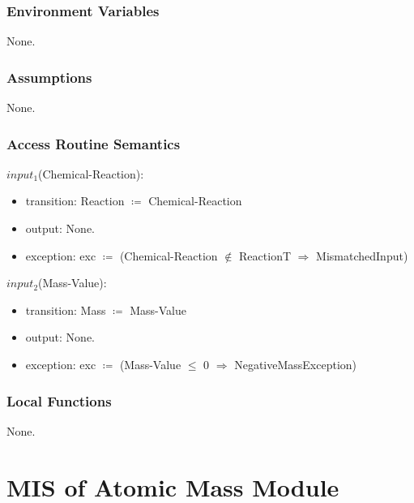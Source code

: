 \documentclass[12pt, titlepage]{article}
\begin{document}
\subsubsection{Environment Variables}

None. 

\subsubsection{Assumptions}

None.

\subsubsection{Access Routine Semantics}

\noindent $input_1$(Chemical-Reaction):
\begin{itemize}
\item transition: Reaction $\coloneqq$ Chemical-Reaction
\item output:  None.
\item exception: exc $\coloneqq$ (Chemical-Reaction $\notin$ ReactionT $\Rightarrow$  MismatchedInput)
\end{itemize}


\noindent $input_2$(Mass-Value):
\begin{itemize}
\item transition: Mass  $\coloneqq$ Mass-Value
\item output:  None.
\item exception: exc $\coloneqq$ (Mass-Value $\leq$ 0 $\Rightarrow$  NegativeMassException)
\end{itemize}


\subsubsection{Local Functions}
 
None.



\newpage

\section{MIS of Atomic Mass Module} \label{Atomic Mass} 
\end{document}
